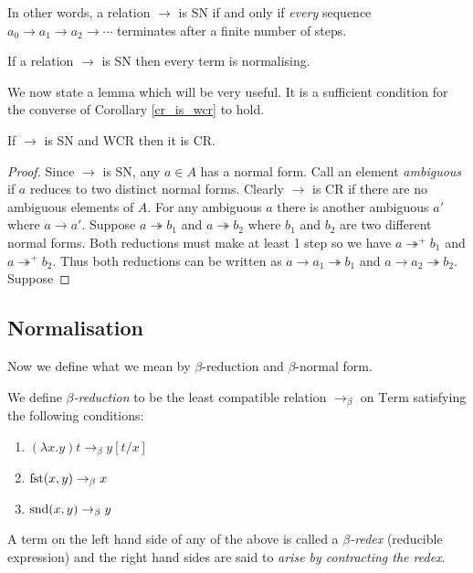 \begin{remark}
    In other words, a relation $\to$ is SN if and only if \emph{every} sequence $a_0 \to a_1 \to a_2 \to  \cdots$ terminates after a finite number of steps.
\end{remark}

\begin{cor}
    If a relation $\to$ is SN then every term is normalising.
\end{cor}

We now state a lemma which will be very useful. It is a sufficient condition for the converse of Corollary \ref{cr_is_wcr} to hold.

\begin{lemma}
    If $\to$ is SN and WCR then it is CR.
\end{lemma}

\begin{proof}
    Since $\to$ is SN, any $a \in A$ has a normal form. Call an element \emph{ambiguous} if $a$ reduces to two distinct normal forms. Clearly $\to$ is CR if there are no ambiguous elements of $A$.
    For any ambiguous $a$ there is another ambiguous $a'$ where $a \to a'$.
    Suppose $a \twoheadrightarrow b_1$ and $a \twoheadrightarrow b_2$ where $b_1$ and $b_2$ are two different normal forms. Both reductions must make at least 1 step so we have $a \twoheadrightarrow^+ b_1$ and $a \twoheadrightarrow^+ b_2$. Thus both reductions can be written as $a \to a_1 \twoheadrightarrow b_1$ and $a \to a_2 \twoheadrightarrow b_2$.
    Suppose 
\end{proof}

\subsection{Normalisation}

Now we define what we mean by $\beta$-reduction and $\beta$-normal form.

\begin{defin}
    We define \emph{$\beta$-reduction} to be the least compatible relation $\to_{\beta}$ on $\mathrm{Term}$ satisfying the following conditions:
    \begin{enumerate}
        \item $(\lambda x . y)t \to_{\beta} y [t / x]$
        \item $\mathrm{fst}(x,y) \to_{\beta} x$
        \item $\mathrm{snd}(x,y) \to_{\beta} y$
    \end{enumerate}
    A term on the left hand side of any of the above is called a \emph{$\beta$-redex} (reducible expression) and the right hand sides are said to \emph{arise by contracting the redex}.
\end{defin}

